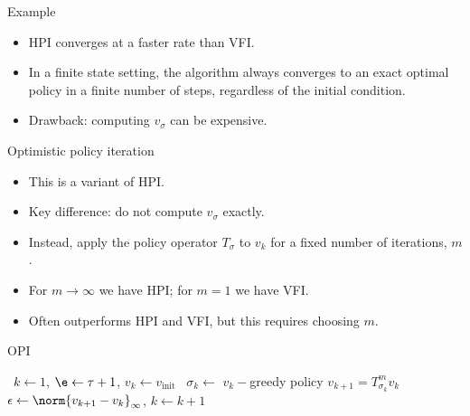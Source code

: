 \documentclass[11pt,xcolor={dvipsnames},aspectratio=159,hyperref={pdftex,pdfpagemode=UseNone,hidelinks,pdfdisplaydoctitle=true},usepdftitle=false]{beamer}
\begin{document}
\begin{frame}{Example}   
    \begin{itemize}
        \item HPI converges at a faster rate than VFI.
        \item In a finite state setting, the
        algorithm always converges to an exact optimal policy in a finite number of steps, regardless of the initial condition.
        \item Drawback: computing $v_\sigma$ can be expensive.
    \end{itemize}
    \end{frame}  

\begin{frame}{Optimistic policy iteration}   
    \begin{itemize}
        \item This is a variant of HPI.
        \item Key difference: do not compute $v_\sigma$ exactly.
        \item Instead, apply the policy operator $T_\sigma$ to $v_k$ for a fixed number of iterations, $m$.
        \item For $m\rightarrow\infty$ we have HPI; for $m=1$ we have VFI.
        \item Often outperforms HPI and VFI, but this requires choosing $m$.
    \end{itemize}
    \end{frame}  

\begin{frame}{OPI}
    \begin{algorithm}[H]
        \caption{Optimistic Policy Iteration}
        \begin{algorithmic}[1]
         \
        \State $k \gets 1$, $\e \gets \tau + 1$, $v_k \gets v_{\text{init}}$
        \While{$\e>\tau$} \
        \State $\sigma_k \gets$ $v_k-$greedy policy
        \State $v_{k+1}=T^m_{\sigma_k} v_k$
        \State $\epsilon \gets \norm{v_{k+1}-v_k}_\infty$, $k \gets k+1$
        \EndWhile
        \EndProcedure
        \end{algorithmic}
        \end{algorithm}
\end{frame}
\end{document}
